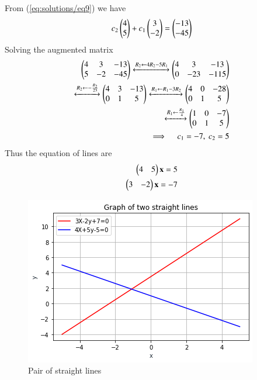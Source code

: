 \documentclass[journal,12pt,twocolumn]{IEEEtran}
\begin{document}
From (\ref{eq:solutions/eq9}) we have
\begin{align}
	c_2\begin{pmatrix}4\\5\end{pmatrix}+c_1\begin{pmatrix}3\\-2\end{pmatrix}=\begin{pmatrix}-13\\-45\end{pmatrix}
\end{align}
Solving the augmented matrix
\begin{align}
	\begin{pmatrix}4 & 3 & -13 \\ 5 & -2 & -45\end{pmatrix}
	\xleftrightarrow[]{R_2 \leftarrow 4R_2-5R_1}
	\begin{pmatrix}4 & 3 & -13 \\ 0 & -23 & -115\end{pmatrix}\\
	\xleftrightarrow[]{R_2 \leftarrow -\frac{R_2}{23}}
        \begin{pmatrix}4 & 3 & -13 \\ 0 & 1 & 5\end{pmatrix}
        \xleftrightarrow[]{R_1 \leftarrow R_1-3R_2}
	\begin{pmatrix}4 & 0 & -28 \\ 0 & 1 & 5\end{pmatrix}\\
	\xleftrightarrow[]{R_1 \leftarrow \frac{R_1}{4}}
        \begin{pmatrix}1 & 0 & -7 \\ 0 & 1 & 5\end{pmatrix} \\
	\implies \quad c_1 =-7, \ c_2 =5
\end{align}
Thus the equation of lines are
\begin{align}
	\begin{pmatrix}4 & 5\end{pmatrix}\mathbf{x} = 5 \\
	\begin{pmatrix}3 & -2\end{pmatrix}\mathbf{x} = -7 
\end{align}
\begin{figure}[h]
    \centering
    \includegraphics[width=\columnwidth]{Figure.png}
    \caption{Pair of straight lines}
    \label{Fig :1}
\end{figure}
\end{document}
